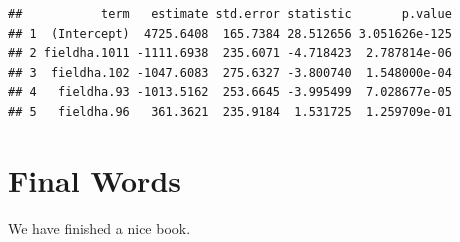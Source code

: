 \documentclass[]{book}
\theoremstyle{definition}
\theoremstyle{definition}
\theoremstyle{remark}
\begin{document}
\begin{verbatim}
##           term   estimate std.error statistic       p.value
## 1  (Intercept)  4725.6408  165.7384 28.512656 3.051626e-125
## 2 fieldha.1011 -1111.6938  235.6071 -4.718423  2.787814e-06
## 3  fieldha.102 -1047.6083  275.6327 -3.800740  1.548000e-04
## 4   fieldha.93 -1013.5162  253.6645 -3.995499  7.028677e-05
## 5   fieldha.96   361.3621  235.9184  1.531725  1.259709e-01
\end{verbatim}

\chapter{Final Words}\label{final-words}

We have finished a nice book.


\end{document}
